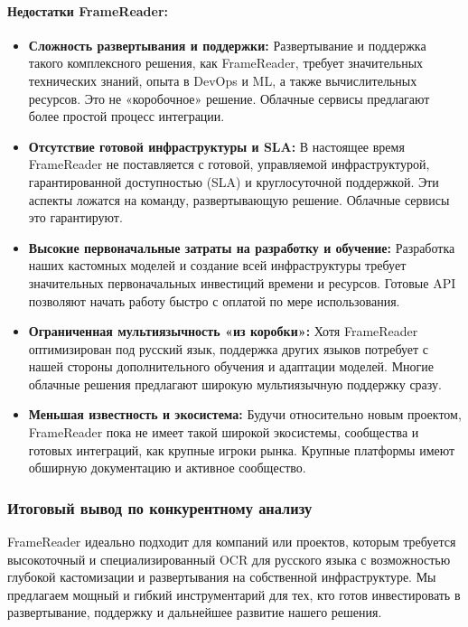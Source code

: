 \documentclass[12pt, a4paper]{article}
\theoremstyle{definition}
\theoremstyle{remark}
\begin{document}
	\paragraph{Недостатки FrameReader:}
	\begin{itemize}
		\item \textbf{Сложность развертывания и поддержки:}
		Развертывание и поддержка такого комплексного решения, как FrameReader, требует значительных технических знаний, опыта в DevOps и ML, а также вычислительных ресурсов. Это не «коробочное» решение. Облачные сервисы предлагают более простой процесс интеграции.
		\item \textbf{Отсутствие готовой инфраструктуры и SLA:}
		В настоящее время FrameReader не поставляется с готовой, управляемой инфраструктурой, гарантированной доступностью (SLA) и круглосуточной поддержкой. Эти аспекты ложатся на команду, развертывающую решение. Облачные сервисы это гарантируют.
		\item \textbf{Высокие первоначальные затраты на разработку и обучение:}
		Разработка наших кастомных моделей и создание всей инфраструктуры требует значительных первоначальных инвестиций времени и ресурсов. Готовые API позволяют начать работу быстро с оплатой по мере использования.
		\item \textbf{Ограниченная мультиязычность «из коробки»:}
		Хотя FrameReader оптимизирован под русский язык, поддержка других языков потребует с нашей стороны дополнительного обучения и адаптации моделей. Многие облачные решения предлагают широкую мультиязычную поддержку сразу.
		\item \textbf{Меньшая известность и экосистема:}
		Будучи относительно новым проектом, FrameReader пока не имеет такой широкой экосистемы, сообщества и готовых интеграций, как крупные игроки рынка. Крупные платформы имеют обширную документацию и активное сообщество.
	\end{itemize}
	
	\subsubsection{Итоговый вывод по конкурентному анализу}
	FrameReader идеально подходит для компаний или проектов, которым требуется высокоточный и специализированный OCR для русского языка с возможностью глубокой кастомизации и развертывания на собственной инфраструктуре. Мы предлагаем мощный и гибкий инструментарий для тех, кто готов инвестировать в развертывание, поддержку и дальнейшее развитие нашего решения.
	
\end{document}
